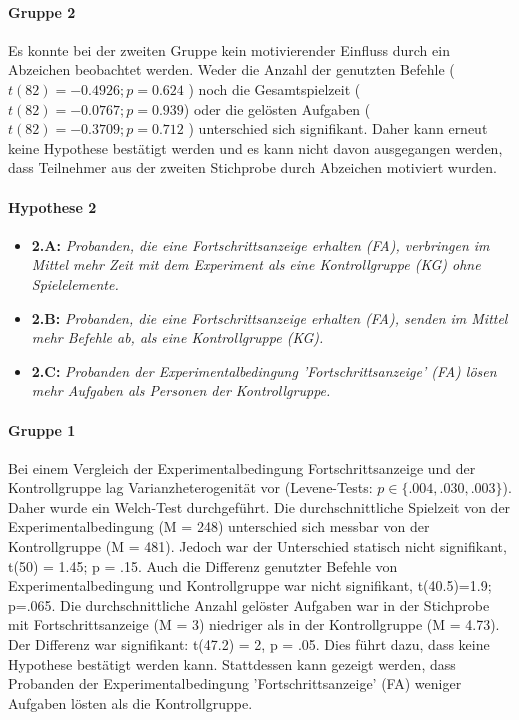 \paragraph{Gruppe 2}
Es konnte bei der zweiten Gruppe kein motivierender Einfluss durch ein Abzeichen beobachtet werden. Weder die Anzahl der genutzten Befehle ( $ t(82)=-0.4926; p=0.624 $ ) noch die Gesamtspielzeit ($t(82)=-0.0767; p=0.939$) oder die gelösten Aufgaben ( $t(82)=-0.3709; p=0.712$ ) unterschied sich signifikant. Daher kann erneut keine Hypothese bestätigt werden und es kann nicht davon ausgegangen werden, dass Teilnehmer aus der zweiten Stichprobe durch Abzeichen motiviert wurden. 


\paragraph{Hypothese 2}
\begin{itemize}
    \item \textbf{2.A:} \textit{Probanden, die eine Fortschrittsanzeige erhalten (FA), verbringen im Mittel mehr Zeit mit dem Experiment als eine Kontrollgruppe (KG) ohne Spielelemente.}
    \item \textbf{2.B:} \textit{Probanden, die eine Fortschrittsanzeige erhalten (FA), senden im Mittel mehr Befehle ab, als eine Kontrollgruppe (KG).}
    \item \textbf{2.C:} \textit{Probanden der Experimentalbedingung 'Fortschrittsanzeige' (FA) lösen mehr Aufgaben als Personen der Kontrollgruppe.} 
\end{itemize}

\paragraph{Gruppe 1}
Bei einem Vergleich der Experimentalbedingung Fortschrittsanzeige und der Kontrollgruppe lag Varianzheterogenität vor (Levene-Tests: $p\in\{.004, .030, .003\}$). Daher wurde ein Welch-Test durchgeführt. Die durchschnittliche Spielzeit von der Experimentalbedingung (M = 248) unterschied sich messbar von der Kontrollgruppe (M = 481). Jedoch war der Unterschied statisch nicht signifikant, t(50) = 1.45; p = .15. Auch die Differenz genutzter Befehle von Experimentalbedingung und Kontrollgruppe war nicht signifikant, t(40.5)=1.9; p=.065. Die durchschnittliche Anzahl gelöster Aufgaben war in der Stichprobe mit Fortschrittsanzeige (M = 3) niedriger als in der Kontrollgruppe (M = 4.73). Der Differenz war signifikant: t(47.2) = 2, p = .05. Dies führt dazu, dass keine Hypothese bestätigt werden kann. Stattdessen kann gezeigt werden, dass Probanden der Experimentalbedingung 'Fortschrittsanzeige' (FA) weniger Aufgaben lösten als die Kontrollgruppe. 


